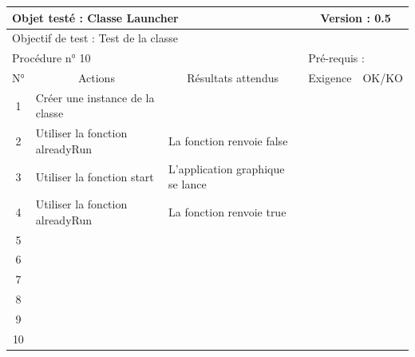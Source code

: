 \documentclass{../res/univ-projet}
\begin{document}
\begin{center}
    \begin{tabular}{|c|p{5cm}|p{5cm}|p{1.5cm}|p{1.5cm}|}
      \hline
      \multicolumn{3}{|l|}{Objet testé : Classe Launcher} & \multicolumn{2}{c|}{Version : 0.5}\\ \hline
      \multicolumn{5}{|l|}{Objectif de test : Test de la classe}\\ \hline
      \multicolumn{3}{|l|}{Procédure n° 10} & \multicolumn{2}{p{3cm}|}{Pré-requis : }\\ \hline
      \multicolumn{1}{|c|}{N°} & \multicolumn{1}{c|}{Actions} & \multicolumn{1}{c|}{Résultats attendus} & 
      \multicolumn{1}{c|}{Exigence} & \multicolumn{1}{c|}{OK/KO}\\ \hline
      1 & Créer une instance de la classe &  &  & \\
      2 & Utiliser la fonction alreadyRun & La fonction renvoie false &  & \\
      3 & Utiliser la fonction start & L'application graphique se lance &  & \\
      4 & Utiliser la fonction alreadyRun & La fonction renvoie true &  & \\
      5 &  &  &  & \\
	  6 &  &  &  & \\
      7 &  &  &  & \\
      8 &  &  &  & \\
      9 &  &  &  & \\
      10 &  &  &  &\\ 
	\hline
    \end{tabular}
    \vskip 2.2cm
    

\end{center}
\end{document}
